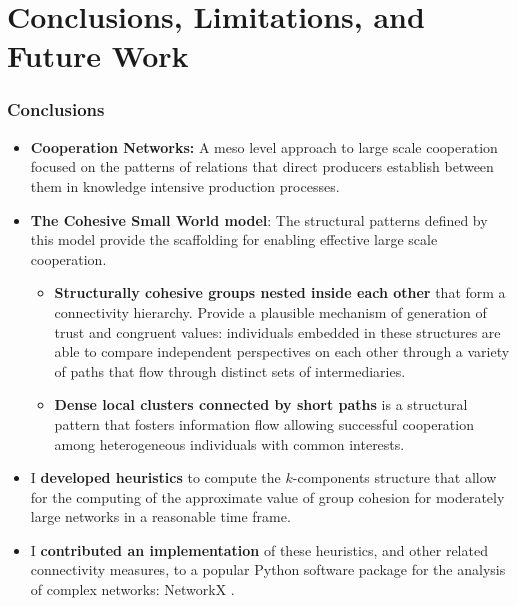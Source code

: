 \documentclass[ignorenonframetext,red,8pt,notes=hide]{beamer}
\begin{document}
\section{Conclusions, Limitations, and Future Work}


\begin{frame}
\frametitle{Conclusions}

\begin{itemize}

\item \textbf{Cooperation Networks:} A meso level approach to large scale cooperation focused on the patterns of relations that direct producers establish between them in knowledge intensive production processes.

\item \textbf{The Cohesive Small World model}: The structural patterns defined by this model provide the scaffolding for enabling effective large scale cooperation.

\begin{itemize}
\item \textbf{Structurally cohesive groups nested inside each other} that form a connectivity hierarchy. Provide a plausible mechanism of generation of trust and congruent values: individuals embedded in these structures are able to compare independent perspectives on each other through a variety of paths that flow through distinct sets of intermediaries.

\item \textbf{Dense local clusters connected by short paths} is a structural pattern that fosters information flow allowing successful cooperation among heterogeneous individuals with common interests. 
\end{itemize}

\item I \textbf{developed heuristics} to compute the $k$-components structure that allow for the computing of the approximate value of group cohesion for moderately large networks in a reasonable time frame.

\item I \textbf{contributed an implementation} of these heuristics, and other related connectivity measures, to a popular Python software package for the analysis of complex networks: NetworkX \citep{hagberg:2008}.

\end{itemize}

\end{frame}
\end{document}
